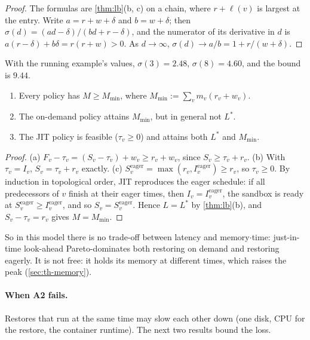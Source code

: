 \begin{proof}
The formulas are \cref{thm:lb}(b, c) on a chain, where $r + \ell(v)$ is largest at the entry.
Write $a = r + w + \delta$ and $b = w + \delta$; then
$\sigma(d) = (a d - \delta)/(b d + r - \delta)$, and the numerator of its derivative in $d$ is
$a(r - \delta) + b\delta = r(r + w) > 0$. As $d \to \infty$, $\sigma(d) \to a/b = 1 + r/(w + \delta)$.
\end{proof}

With the running example's values, $\sigma(3) = 2.48$, $\sigma(8) = 4.60$, and the bound is
$9.44$.

\begin{theorem}
\label{thm:jit}
\begin{enumerate}[label=(\alph*)]
  \item Every policy has $M \ge M_{\min}$, where $M_{\min} := \sum_v m_v (r_v + w_v)$.
  \item The on-demand policy attains $M_{\min}$, but in general not $L^*$.
  \item The JIT policy is feasible ($\tau_v \ge 0$) and attains both $L^*$ and $M_{\min}$.
\end{enumerate}
\end{theorem}

\begin{proof}
(a) $F_v - \tau_v = (S_v - \tau_v) + w_v \ge r_v + w_v$, since $S_v \ge \tau_v + r_v$.
(b) With $\tau_v = I_v$, $S_v = \tau_v + r_v$ exactly.
(c) $S^{\mathrm{eager}}_v = \max(r_v, I^{\mathrm{eager}}_v) \ge r_v$, so $\tau_v \ge 0$. By
induction in topological order, JIT reproduces the eager schedule: if all predecessors of $v$
finish at their eager times, then $I_v = I^{\mathrm{eager}}_v$, the sandbox is ready at
$S^{\mathrm{eager}}_v \ge I^{\mathrm{eager}}_v$, and so $S_v = S^{\mathrm{eager}}_v$. Hence
$L = L^*$ by \cref{thm:lb}(b), and $S_v - \tau_v = r_v$ gives $M = M_{\min}$.
\end{proof}

So in this model there is no trade-off between latency and memory$\cdot$time: just-in-time
look-ahead Pareto-dominates both restoring on demand and restoring eagerly. It is not free:
it holds its memory at different times, which raises the peak (\cref{sec:th-memory}).

\paragraph{When A2 fails.} Restores that run at the same time may slow each other down (one
disk, CPU for the restore, the container runtime). The next two results bound the loss.

